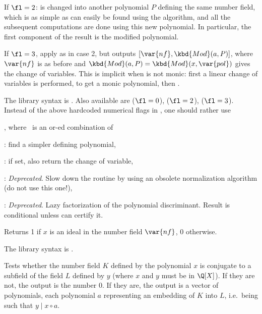 If $\fl=2$:  is changed into another polynomial $P$ defining the same
number field, which is as simple as can easily be found using the
 algorithm, and all the subsequent computations are done
using this new polynomial. In particular, the first component of the result
is the modified polynomial.

If $\fl=3$, apply  as in case 2, but outputs
$[\var{nf},\kbd{Mod}(a,P)]$, where $\var{nf}$ is as before and
$\kbd{Mod}(a,P)=\kbd{Mod}(x,\var{pol})$ gives the change of
variables. This is implicit when  is not monic: first a linear change
of variables is performed, to get a monic polynomial, then .

The library syntax is .
Also available are
 ($\fl = 0$),
 ($\fl = 2$),
 ($\fl = 3$).
Instead of the above hardcoded numerical flags in , one should
rather use

, where \fl\ is an
or-ed combination of

\item {}: find a simpler defining polynomial,

\item {}: if  set, also return the change of variable,

\item {}: \emph{Deprecated}. Slow down the routine by using an
obsolete normalization algorithm (do not use this one!),

\item {}: \emph{Deprecated}. Lazy factorization of the
polynomial discriminant. Result is conditional unless 
can certify it.

\label{se:nfisideal}
Returns 1 if $x$ is an ideal in the number field $\var{nf}$, 0 otherwise.

The library syntax is .

\label{se:nfisincl}
Tests whether the number field $K$ defined
by the polynomial $x$ is conjugate to a subfield of the field $L$ defined
by $y$ (where $x$ and $y$ must be in $\Q[X]$). If they are not, the output
is the number 0. If they are, the output is a vector of polynomials, each
polynomial $a$ representing an embedding of $K$ into $L$, i.e.~being such
that $y\mid x\circ a$.

